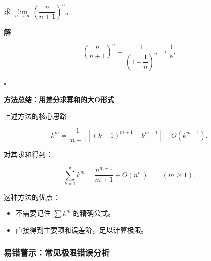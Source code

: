\documentclass[fontset=fandol]{ctexart}
\newenvironment{custom}[1]{\par\noindent\textbf{#1}\quad}{\par\vspace{0.8em}}
\newenvironment{solution}{\par\noindent\textbf{解}\quad}{\hfill$\square$\par\vspace{0.8em}}
\newcommand{\ee}{\mathrm{e}}
\begin{document}
\begin{example}

求 \(\lim\limits_{n\to\infty} \left(\dfrac{n}{n+1}\right)^n\)。

\end{example}

\begin{solution}

\[

\left(\dfrac{n}{n+1}\right)^n = \dfrac{1}{\left(1 + \dfrac{1}{n}\right)^n} \to \dfrac{1}{\ee}.

\]

\end{solution}







\begin{custom}{方法总结：用差分求幂和的大O形式}



上述方法的核心思路：

\[

k^m = \dfrac{1}{m+1} \left[(k+1)^{m+1} - k^{m+1}\right] + O(k^{m-1}).

\]



对其求和得到：

\[

\sum_{k=1}^n k^m

=\frac{n^{m+1}}{m+1}+O(n^m)

\qquad(m\ge1).

\]



这种方法的优点：

\begin{itemize}

\item 不需要记住 \(\sum  k^m\) 的精确公式。

\item 直接得到主要项和误差阶，足以计算极限。

\end{itemize}

\end{custom}



\subsubsection{易错警示：常见极限错误分析}
\end{document}
